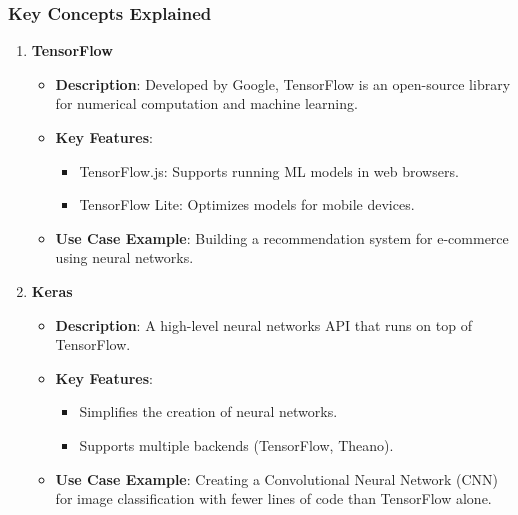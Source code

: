 \documentclass{beamer}
\begin{document}
\begin{frame}[fragile]
    \frametitle{Key Concepts Explained}
    \begin{enumerate}
        \item \textbf{TensorFlow}
            \begin{itemize}
                \item \textbf{Description}: Developed by Google, TensorFlow is an open-source library for numerical computation and machine learning.
                \item \textbf{Key Features}:
                    \begin{itemize}
                        \item TensorFlow.js: Supports running ML models in web browsers.
                        \item TensorFlow Lite: Optimizes models for mobile devices.
                    \end{itemize}
                \item \textbf{Use Case Example}: Building a recommendation system for e-commerce using neural networks.
            \end{itemize}
        
        \item \textbf{Keras}
            \begin{itemize}
                \item \textbf{Description}: A high-level neural networks API that runs on top of TensorFlow.
                \item \textbf{Key Features}:
                    \begin{itemize}
                        \item Simplifies the creation of neural networks.
                        \item Supports multiple backends (TensorFlow, Theano).
                    \end{itemize}
                \item \textbf{Use Case Example}: Creating a Convolutional Neural Network (CNN) for image classification with fewer lines of code than TensorFlow alone.
            \end{itemize}


\end{enumerate}
\end{frame}
\end{document}
